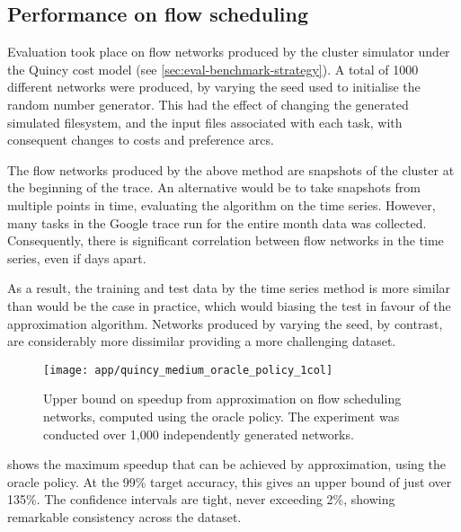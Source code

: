 
\subsection{Performance on flow scheduling}

Evaluation took place on flow networks produced by the cluster simulator under the Quincy cost model (see \cref{sec:eval-benchmark-strategy}). A total of 1000 different networks were produced, by varying the seed used to initialise the random number generator. This had the effect of changing the generated simulated filesystem, and the input files associated with each task, with consequent changes to costs and preference arcs.

The flow networks produced by the above method are snapshots of the cluster at the beginning of the trace. An alternative would be to take snapshots from multiple points in time, evaluating the algorithm on the time series. However, many tasks in the Google trace run for the entire month data was collected. Consequently, there is significant correlation between flow networks in the time series, even if days apart.

As a result, the training and test data by the time series method is more similar than would be the case in practice, which would biasing the test in favour of the approximation algorithm. Networks produced by varying the seed, by contrast, are considerably more dissimilar providing a more challenging dataset.

\begin{figure}
    \centering
    \texttt{[image: app/quincy\_medium\_oracle\_policy\_1col]}
    \caption[Upper bound on speedup from approximation with flow scheduling]{Upper bound on speedup from approximation on flow scheduling networks, computed using the oracle policy. The experiment was conducted over 1,000 independently generated networks.}
    \label{fig:app-quincy-medium-oracle}
\end{figure}

 shows the maximum speedup that can be achieved by approximation, using the oracle policy. At the 99\% target accuracy, this gives an upper bound of just over 135\%. The confidence intervals are tight, never exceeding 2\%, showing remarkable consistency across the dataset.

